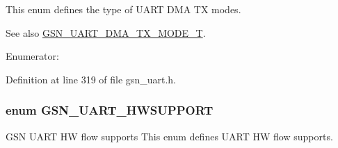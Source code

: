 This enum defines the type of UART DMA TX modes. \begin{DoxySeeAlso}{See also}
\hyperlink{a00656_gaca97ddd99d6a776d3991457a1113f687}{GSN\_\-UART\_\-DMA\_\-TX\_\-MODE\_\-T}. 
\end{DoxySeeAlso}
\begin{Desc}
\item[Enumerator: ]\par
\begin{description}
\item[{\em 
\hypertarget{a00656_gga09347558a3ca84081b700f762369ff09ab713fb7412083d9608b9c7dcb47705f9}{
GSN\_\-UART\_\-DMA\_\-TX\_\-CLEAR}
\label{a00656_gga09347558a3ca84081b700f762369ff09ab713fb7412083d9608b9c7dcb47705f9}
}]\item[{\em 
\hypertarget{a00656_gga09347558a3ca84081b700f762369ff09a678a20a0d6e4f1a555e07f1291188153}{
GSN\_\-UART\_\-DMA\_\-TX\_\-SET}
\label{a00656_gga09347558a3ca84081b700f762369ff09a678a20a0d6e4f1a555e07f1291188153}
}]\end{description}
\end{Desc}



Definition at line 319 of file gsn\_\-uart.h.

\hypertarget{a00656_ga533c64d91240c65815984fe1f73817b2}{
\subsubsection[{GSN\_\-UART\_\-HWSUPPORT}]{\setlength{\rightskip}{0pt plus 5cm}enum {\bf GSN\_\-UART\_\-HWSUPPORT}}}
\label{a00656_ga533c64d91240c65815984fe1f73817b2}


GSN UART HW flow supports This enum defines UART HW flow supports. 

